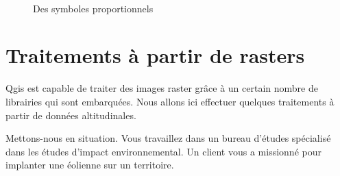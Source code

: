 \documentclass[a4paper, 11pt]{article}
\begin{document}
  \begin{figure}
  \centering
  \\
    \caption{Des symboles proportionnels}\label{fig:analyseThematique}
  \end{figure}

\section{Traitements à partir de rasters}
  Qgis est capable de traiter des images raster grâce à un certain nombre de librairies qui sont embarquées. Nous allons ici effectuer quelques traitements à partir de données altitudinales.

  Mettons-nous en situation. Vous travaillez dans un bureau d'études spécialisé dans les études d'impact environnemental. Un client vous a missionné pour implanter une éolienne sur un territoire.
\end{document}
